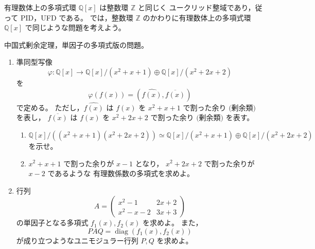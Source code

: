 
\begin{exercise}
	有理数体上の多項式環 \(\mathbb{Q}[x]\) は整数環 \(\mathbb{Z}\) と同じく
	ユークリッド整域であり，従って PID，UFD である。
	では，整数環 \(\mathbb{Z}\) のかわりに有理数体上の多項式環
	\(\mathbb{Q}[x]\) で同じような問題を考えよう。
	
	中国式剰余定理，単因子の多項式版の問題。
	
	\begin{enumerate}
		\item[(A)]
		準同型写像
		\[
		\varphi:\mathbb{Q}[x]
		\longrightarrow
		\mathbb{Q}[x]/(x^2+x+1)
		\oplus
		\mathbb{Q}[x]/(x^2+2x+2)
		\]
		を
		\[
		\varphi(f(x))
		=
		\left(\widehat{f(x)},\overline{f(x)}\right)
		\]
		で定める。
		ただし，\(\widehat{f(x)}\) は \(f(x)\) を \(x^2+x+1\) で割った余り
		\((\)剰余類\()\) を表し，
		\(\overline{f(x)}\) は \(f(x)\) を \(x^2+2x+2\) で割った余り
		\((\)剰余類\()\) を表す。
		
		\begin{enumerate}
			\item
			\[
			\mathbb{Q}[x]/
			\left((x^2+x+1)(x^2+2x+2)\right)
			\simeq
			\mathbb{Q}[x]/(x^2+x+1)
			\oplus
			\mathbb{Q}[x]/(x^2+2x+2)
			\]
			を示せ。
			
			\item
			\(x^2+x+1\) で割った余りが \(x-1\) となり，
			\(x^2+2x+2\) で割った余りが \(x-2\) であるような
			有理数係数の多項式を求めよ。
		\end{enumerate}
		
		\item[(B)]
		行列
		\[
		A=
		\begin{pmatrix}
			x^2-1 & 2x+2\\
			x^2-x-2 & 3x+3
		\end{pmatrix}
		\]
		の単因子となる多項式 \(f_1(x),f_2(x)\) を求めよ。
		また，
		\[
		PAQ=\operatorname{diag}(f_1(x),f_2(x))
		\]
		が成り立つようなユニモジュラー行列 \(P,Q\) を求めよ。
	\end{enumerate}
\end{exercise}

